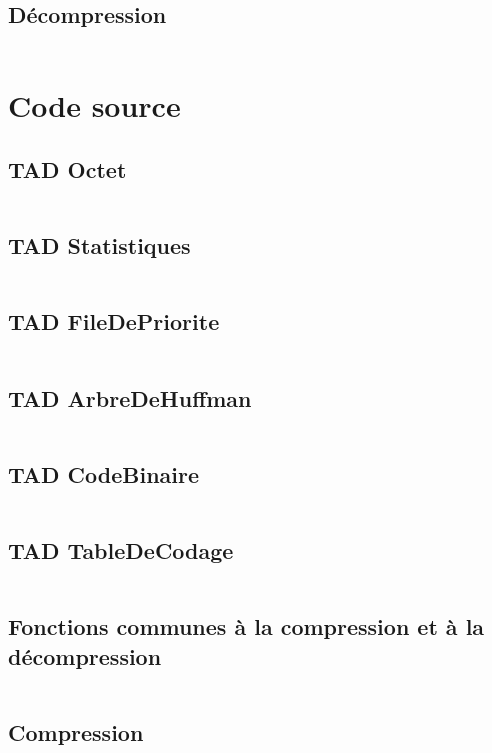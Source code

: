 \documentclass[10pt]{report}
\begin{document}
            \subsection{Décompression}
                \inputminted[breaklines]{c}{../include/decompression.h} 

        \newpage
        \section{Code source}
            \subsection{TAD Octet}
                \inputminted[breaklines]{c}{../src/octet.c}
            \subsection{TAD Statistiques}
                \inputminted[breaklines]{c}{../src/statistiques.c}
            \subsection{TAD FileDePriorite}
                \inputminted[breaklines]{c}{../src/fileDePrioriteDArbreDeHuffman.c}
            \subsection{TAD ArbreDeHuffman}
                \inputminted[breaklines]{c}{../src/arbreDeHuffman.c}
            \subsection{TAD CodeBinaire}
                \inputminted[breaklines]{c}{../src/codeBinaire.c}
            \subsection{TAD TableDeCodage}
                \inputminted[breaklines]{c}{../src/tableDeCodage.c}
            \subsection{Fonctions communes à la compression et à la décompression}
                \inputminted[breaklines]{c}{../src/construireArbreDeHuffman.c}
            \subsection{Compression}
                \inputminted[breaklines]{c}{../src/compression.c}
\end{document}
